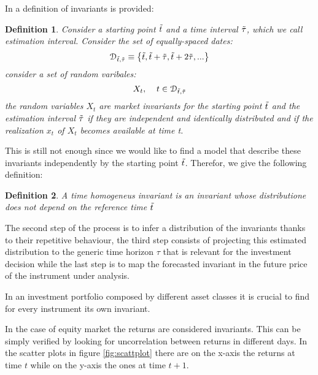 In \citep{Meucci} a definition of invariants is provided:
\newtheorem{definition}{Definition}[section]
\begin{definition}
    Consider a starting point $\Tilde{t}$ and a time interval $\Tilde{\tau}$, which we call estimation interval. Consider the set of equally-spaced dates:
    \begin{equation}
        \mathcal{D}_{\Tilde{t},\Tilde{\tau}} \equiv \left\{\Tilde{t},\Tilde{t}+\Tilde{\tau},\Tilde{t}+2\Tilde{\tau},...\right\}
    \end{equation}
    consider a set of random varibales:
    \begin{equation}
        X_t, \: \: \: \: \: t \in \mathcal{D}_{\Tilde{t},\Tilde{\tau}}
    \end{equation}
    the random variables $X_t$ are market invariants for the starting point $\Tilde{t}$ and the estimation interval $\Tilde{\tau}$ if they are independent and identically distributed and if the realization $x_t$ of $X_t$ becomes available at time t.
\end{definition}
\bigskip
This is still not enough since we would like to find a model that describe these invariants independently by the starting point $\Tilde{t}$.
Therefor, we give the following definition:
\begin{definition}
    A time homogeneus invariant is an invariant whose distributione does not depend on the reference time $\Tilde{t}$
\end{definition}
\bigskip

The second step of the process is to infer a distribution of the invariants thanks to their repetitive behaviour, the third step consists of projecting this estimated distribution to the generic time horizon $\tau$ that is relevant for the investment decision while the last step is to map the forecasted invariant in the future price of the instrument under analysis.
\bigskip

In an investment portfolio composed by different asset classes it is crucial to find for every instrument its own invariant.


In the case of equity market the returns are considered invariants. This can be simply verified by looking for uncorrelation between returns in different days. In the scatter plots in figure \ref{fig:scattplot} there are on the x-axis the returns at time $t$ while on the y-axis the ones at time $t+1$. 

